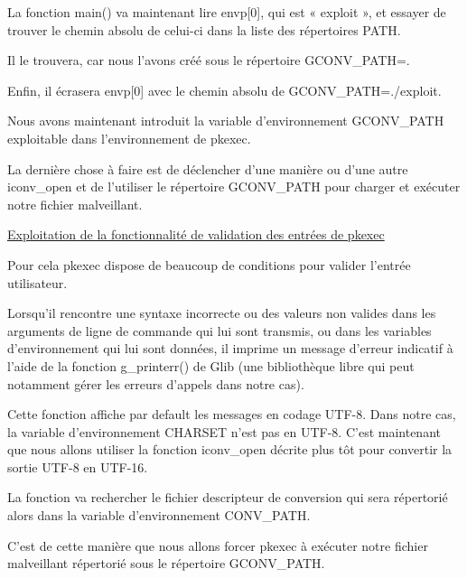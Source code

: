 \documentclass[12pt,a4paper]{article}
\begin{document}
\begin{flushleft}
            \item La fonction main() va maintenant lire envp[0], qui est « exploit », et essayer de trouver le chemin absolu de celui-ci dans la liste des répertoires PATH. 
            \item Il le trouvera, car nous l’avons créé sous le répertoire GCONV\_PATH=. 
            \item Enfin, il écrasera envp[0] avec le chemin absolu de GCONV\_PATH=./exploit.
            \item Nous avons maintenant introduit la variable d’environnement GCONV\_PATH exploitable dans l’environnement de pkexec. 
            \item La dernière chose à faire est de déclencher d’une manière ou d’une autre iconv\_open et de l’utiliser le répertoire GCONV\_PATH pour charger et exécuter notre fichier malveillant.
            \item \underline{Exploitation de la fonctionnalité de validation des entrées de pkexec}
            \item Pour cela pkexec dispose de beaucoup de conditions pour valider l'entrée utilisateur.
            \item Lorsqu’il rencontre une syntaxe incorrecte ou des valeurs non valides dans les arguments de ligne de commande qui lui sont transmis, ou dans les variables d’environnement qui lui sont données, il imprime un message d’erreur indicatif à l’aide de la fonction g\_printerr() de Glib (une bibliothèque libre qui peut notamment gérer les erreurs d'appels dans notre cas).
            \item Cette fonction affiche par default les messages en codage UTF-8. Dans notre cas, la variable d'environnement CHARSET n'est pas en UTF-8. C'est maintenant que nous allons utiliser la fonction iconv\_open décrite plus tôt pour convertir la sortie UTF-8 en UTF-16.
            \item La fonction va rechercher le fichier descripteur de conversion qui sera répertorié alors dans la variable d'environnement CONV\_PATH.
            \item C'est de cette manière que nous allons forcer pkexec à exécuter notre fichier malveillant répertorié sous le répertoire GCONV\_PATH.



\end{flushleft}
\end{document}
